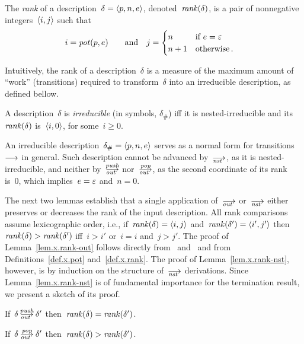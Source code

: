 \begin{definition}
  \label{def.x.rank}
  The \emph{rank} of a description~$\delta=\<p,n,e>$,
  denoted~$\operatorname{\mathit{rank}}(\delta)$, is a pair of nonnegative integers~$\<i,j>$ such
  that
  \begin{alignat*}{2}
    i&=\operatorname{\mathit{pot}}(p,e) &\quad\text{and}\quad
    j&=
       \begin{cases}
         n  &\text{if~$e=\varepsilon$}\\
         n+1&\text{otherwise\,.}
       \end{cases}
  \end{alignat*}
\end{definition}

Intuitively, the rank of a description~$\delta$ is a measure of the maximum
amount of ``work'' (transitions) required to transform~$\delta$ into an
irreducible description, as defined bellow.

\begin{definition}
  \label{def.x.H}
  A description~$\delta$ is \emph{irreducible} (in symbols, $\delta_\#$) iff
  it is nested-irreducible and its~$\operatorname{\mathit{rank}}(\delta)$ is~$\<i,0>$, for
  some~$i\ge0$.
\end{definition}

An irreducible description~$\delta_\#=\<p,n,e>$ serves as a normal form for
transitions~$\trans$ in general.  Such description cannot be advanced
by~$\nst$, as it is nested-irreducible, and neither by~$\outpush$
nor~$\outpop$, as the second coordinate of its rank is~0, which
implies~$e=\varepsilon$ and~$n=0$.

The next two lemmas establish that a single application of~$\out$ or~$\nst$
either preserves or decreases the rank of the input description.  All rank
comparisons assume lexicographic order, i.e., if~$\rank(\delta)=\<i,j>$
and~$\rank(\delta')=\<i',j'>$ then~$\operatorname{\mathit{rank}}(\delta)>\operatorname{\mathit{rank}}(\delta')$ iff~$i>i'$
or~$i=i$ and~$j>j'$.
The proof of Lemma~\ref{lem.x.rank-out} follows directly from~
and~ and from Definitions~\ref{def.x.pot} and~\ref{def.x.rank}.  The
proof of Lemma~\ref{lem.x.rank-nst}, however, is by induction on the
structure of~$\nst$ derivations.  Since Lemma~\ref{lem.x.rank-nst} is of
fundamental importance for the termination result, we present a sketch of its
proof.

\begin{lemma}\strut
  \label{lem.x.rank-out}
  \begin{enumerate:a}
  \item\label{lem.rank-out-push} If~$\delta\outpush\delta'$
    then~$\operatorname{\mathit{rank}}(\delta)=\operatorname{\mathit{rank}}(\delta')$.
  \item\label{lem.rank-out-pop} If~$\delta\outpop\delta'$
    then~$\operatorname{\mathit{rank}}(\delta)>\operatorname{\mathit{rank}}(\delta')$.
  \end{enumerate:a}
\end{lemma}

